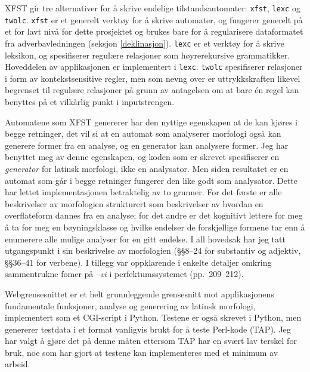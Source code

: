 \documentclass{article}
\let\prog\texttt
\let\w\emph
\begin{document}
XFST gir tre alternativer for \aa{} skrive endelige tilstandsautomater:
\prog{xfst}, \prog{lexc} og \prog{twolc}. \prog{xfst} er et generelt
verkt\o{}y for \aa{} skrive automater, og fungerer generelt p\aa{} et for lavt
niv\aa{} for dette prosjektet og brukes bare for \aa{} regularisere
dataformatet fra adverbavledningen (seksjon \ref{deklinasjon}). \prog{lexc} er
et verkt\o{}y for \aa{} skrive leksikon, og spesifiserer regul\ae{}re
relasjoner som h\o{}yrerekursive grammatikker. Hoveddelen av applikasjonen er
implementert i \prog{lexc}. \prog{twolc} spesifiserer relasjoner i form av
kontekstsensitive regler, men som nevng over er uttrykkskraften likevel
begrenset til regul\ae{}re relasjoner p\aa{} grunn av antagelsen om at bare
\'en regel kan benyttes p\aa{} et vilk\aa{}rlig punkt i inputstrengen.
\cite{xfst,twolc}

Automatene som XFST genererer har den nyttige egenskapen at de kan kj\o{}res i
begge retninger, det vil si at en automat som analyserer morfologi ogs\aa{}
kan generere former fra en analyse, og en generator kan analysere former. Jeg
har benyttet meg av denne egenskapen, og koden som er skrevet spesifiserer en
\emph{generator} for latinsk morfologi, ikke en analysator. Men siden
resultatet er en automat som g\aa{}r i begge retninger fungerer den like godt
som analysator. Dette har lettet implementasjonen betraktelig av to grunner.
For det f\o{}rste er alle beskrivelser av morfologien strukturert som
beskrivelser av hvordan en overflateform dannes fra en analyse; for det andre
er det kognitivt lettere for meg \aa{} ta for meg en b\o{}yningsklasse og
hvilke endelser de forskjellige formene tar enn \aa{} enumerere alle mulige
analyser for en gitt endelse. I all hovedsak har jeg tatt utgangspunkt i
 sin beskrivelse av morfologien (\S\S 8--24 for substantiv og
adjektiv, \S\S 36--41 for verbene). I tillegg var  oppklarende i
enkelte detaljer omkring sammentrukne fomer p\aa{} \w{--vi} i
perfektumssystemet (pp.~209--212).

Webgrensesnittet er et helt grunnleggende grensesnitt mot applikasjonens
fundamentale funksjoner, analyse og generering av latinsk morfologi,
implementert som et CGI-script i Python. Testene er ogs\aa{} skrevet i Python,
men genererer testdata i et format vanligvis brukt for \aa{} teste Perl-kode
(TAP). Jeg har valgt \aa{} gj\o{}re det p\aa{} denne m\aa{}ten ettersom TAP
har en sv\ae{}rt lav terskel for bruk, noe som har gjort at testene kan
implementeres med et minimum av arbeid.
\end{document}
